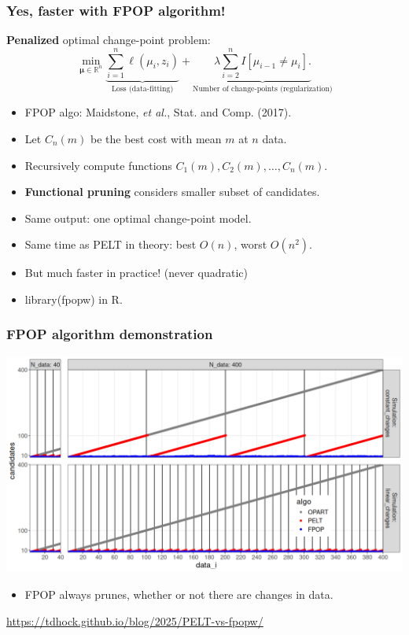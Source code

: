 \documentclass{beamer}
\newcommand{\RR}{\mathbb R}
\begin{document}
\begin{frame}
  \frametitle{Yes, faster with FPOP algorithm!}
  \textbf{Penalized} optimal change-point problem:
$$
\min_{
  \mathbf \mu\in\RR^{n}
}
\underbrace{\sum_{i=1}^{n} \ell( \mu_i,  z_i)}_{\text{Loss (data-fitting)}} + \underbrace{\lambda\sum_{i=2}^n I[\mu_{i-1}\neq \mu_i].}_{\text{Number of change-points (regularization)}}
$$
\begin{itemize}
\item FPOP algo: Maidstone, \emph{et al.}, Stat. and Comp. (2017).
\item Let $C_n(m)$ be the best cost with mean $m$ at $n$ data.
\item Recursively compute functions $C_{1}(m), C_2(m),\dots, C_{n}(m)$.
\item \textbf{Functional pruning} considers smaller subset of candidates.
\item Same output: one optimal change-point model.
\item Same time as PELT in theory: best $O(n)$, worst $O(n^2)$.
\item But much faster in practice! (never quadratic)
\item library(fpopw) in R.
\end{itemize}
\end{frame}



\begin{frame}
  \frametitle{FPOP algorithm demonstration}
  \includegraphics[width=\textwidth]{fpop-prune-1.png}

  \begin{itemize}
  \item FPOP always prunes, whether or not there are changes in data.
  \end{itemize}

  \url{https://tdhock.github.io/blog/2025/PELT-vs-fpopw/}
\end{frame}
 
\end{document}
